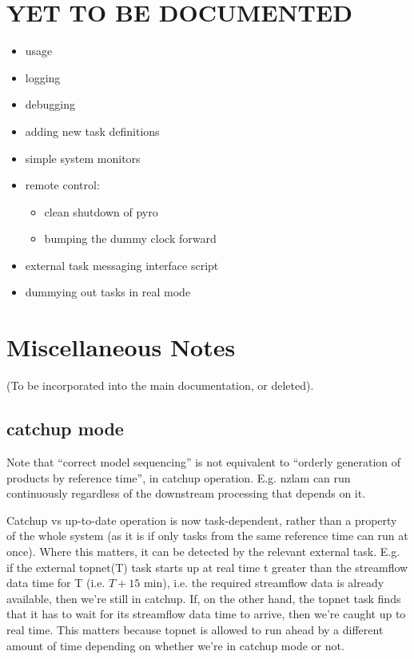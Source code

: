\documentclass[11pt,a4paper]{report}
\begin{document}
\chapter{YET TO BE DOCUMENTED}

\begin{itemize}
 \item usage
 \item logging
 \item debugging
 \item adding new task definitions
 \item simple system monitors
 \item remote control: 
    \begin{itemize}
    \item clean shutdown of pyro
    \item bumping the dummy clock forward
    \end{itemize}
 \item external task messaging interface script
 \item dummying out tasks in real mode
\end{itemize}

\chapter{Miscellaneous Notes}

(To be incorporated into the main documentation, or deleted).

\section{catchup mode}

Note that ``correct model sequencing'' is not equivalent to ``orderly
generation of products by reference time'', in catchup operation.  E.g.
nzlam can run continuously regardless of the downstream processing that
depends on it.

Catchup vs up-to-date operation is now task-dependent, rather than a
property of the whole system (as it is if only tasks from the same
reference time can run at once).  Where this matters, it can be detected
by the relevant external task. E.g. if the external topnet(T) task
starts up at real time t greater than the streamflow data time for T
(i.e. $T+15$ min), i.e. the required streamflow data is already available,
then we're still in catchup. If, on the other hand, the topnet task
finds that it has to wait for its streamflow data time to arrive, then
we're caught up to real time.  This matters because topnet is allowed to
run ahead by a different amount of time depending on whether we're in
catchup mode or not.
\end{document}
